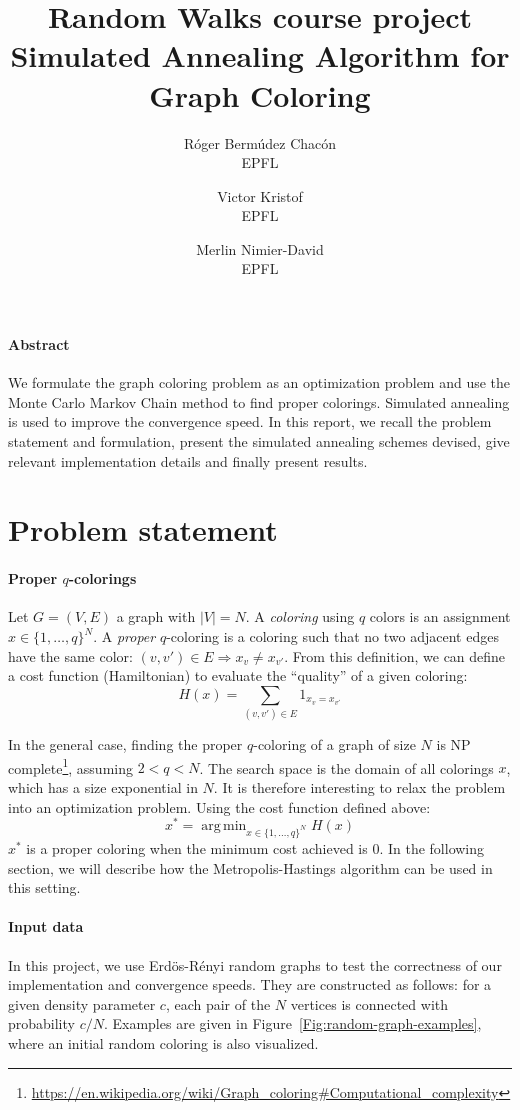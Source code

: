 \documentclass{report}
\title{Random Walks course project\\Simulated Annealing Algorithm for Graph Coloring}
\author{
  R\'oger Berm\'udez Chac\'on\\EPFL
  \and
  Victor Kristof\\EPFL
  \and
  Merlin Nimier-David\\EPFL
}
\DeclareMathOperator*{\argmin}{arg\,min}
\begin{document}
  \maketitle

  \paragraph{Abstract}
  We formulate the graph coloring problem as an optimization problem and use the Monte Carlo Markov Chain method to find proper colorings. Simulated annealing is used to improve the convergence speed. In this report, we recall the problem statement and formulation, present the simulated annealing schemes devised, give relevant implementation details and finally present results.

  \section*{Problem statement}
  \paragraph{Proper $q$-colorings}
  Let $G = (V, E)$ a graph with $|V| = N$. A \emph{coloring} using $q$ colors is an assignment $x \in \{ 1, \ldots, q \}^N$. A \emph{proper} $q$-coloring is a coloring such that no two adjacent edges have the same color: $(v, v') \in E \Rightarrow x_v \neq x_{v'}$. From this definition, we can define a cost function (Hamiltonian) to evaluate the ``quality'' of a given coloring:
  \[
    H(x) = \sum_{(v, v') \in E} 1_{x_v = x_{v'}}
  \]

  In the general case, finding the proper $q$-coloring of a graph of size $N$ is NP complete\footnote{\url{https://en.wikipedia.org/wiki/Graph_coloring#Computational_complexity}}, assuming $2 < q < N$. The search space is the domain of all colorings $x$, which has a size exponential in $N$. It is therefore interesting to relax the problem into an optimization problem. Using the cost function defined above:
  \[
    x^* = \argmin_{x \in \{ 1, \ldots, q \}^N} H(x)
  \]
  $x^*$ is a proper coloring when the minimum cost achieved is $0$. In the following section, we will describe how the Metropolis-Hastings algorithm can be used in this setting.

  \paragraph{Input data}
  In this project, we use Erd\"{o}s-R\'{e}nyi random graphs to test the correctness of our implementation and convergence speeds. They are constructed as follows: for a given density parameter $c$, each pair of the $N$ vertices is connected with probability $c / N$. Examples are given in Figure~\ref{Fig:random-graph-examples}, where an initial random coloring is also visualized.
\end{document}

